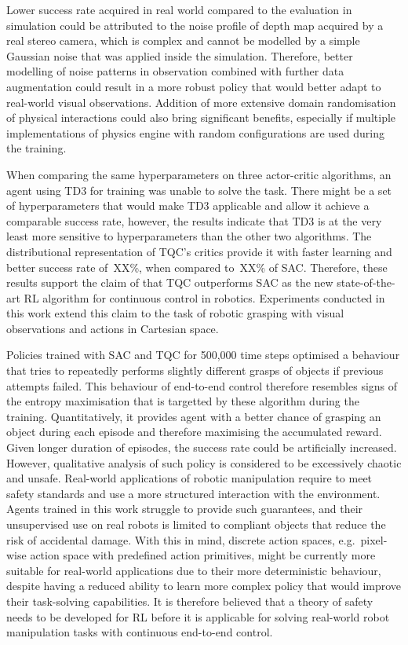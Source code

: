 Lower success rate acquired in real world compared to the evaluation in simulation could be attributed to the noise profile of depth map acquired by a real stereo camera, which is complex and cannot be modelled by a simple Gaussian noise that was applied inside the simulation. Therefore, better modelling of noise patterns in observation combined with further data augmentation could result in a more robust policy that would better adapt to real-world visual observations. Addition of more extensive domain randomisation of physical interactions could also bring significant benefits, especially if multiple implementations of physics engine with random configurations are used during the training.

When comparing the same hyperparameters on three actor-critic algorithms, an agent using TD3 for training was unable to solve the task. There might be a set of hyperparameters that would make TD3 applicable and allow it achieve a comparable success rate, however, the results indicate that TD3 is at the very least more sensitive to hyperparameters than the other two algorithms. The distributional representation of TQC's critics provide it with faster learning and better success rate of~XX\%, when compared to~XX\% of SAC. Therefore, these results support the claim of \citet{kuznetsov_controlling_2020} that TQC outperforms SAC as the new state-of-the-art RL algorithm for continuous control in robotics. Experiments conducted in this work extend this claim to the task of robotic grasping with visual observations and actions in Cartesian space.

Policies trained with SAC and TQC for 500,000 time steps optimised a behaviour that tries to repeatedly performs slightly different grasps of objects if previous attempts failed. This behaviour of end-to-end control therefore resembles signs of the entropy maximisation that is targetted by these algorithm during the training. Quantitatively, it provides agent with a better chance of grasping an object during each episode and therefore maximising the accumulated reward. Given longer duration of episodes, the success rate could be artificially increased. However, qualitative analysis of such policy is considered to be excessively chaotic and unsafe. Real-world applications of robotic manipulation require to meet safety standards and use a more structured interaction with the environment. Agents trained in this work struggle to provide such guarantees, and their unsupervised use on real robots is limited to compliant objects that reduce the risk of accidental damage. With this in mind, discrete action spaces, e.g.~pixel-wise action space with predefined action primitives, might be currently more suitable for real-world applications due to their more deterministic behaviour, despite having a reduced ability to learn more complex policy that would improve their task-solving capabilities. It is therefore believed that a theory of safety needs to be developed for RL before it is applicable for solving real-world robot manipulation tasks with continuous end-to-end control.

